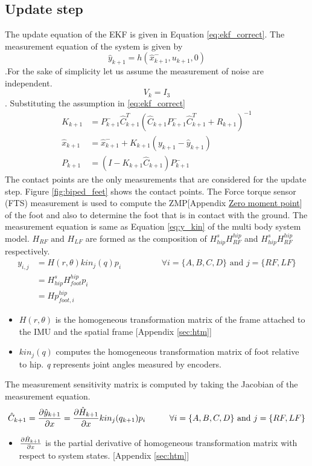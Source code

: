 \subsection{Update step}
The update equation of the EKF is given in Equation \ref{eq:ekf_correct}. The measurement equation of the system is given by $$\hat{y}_{k+1} = h(\hat{x}_{k+1}^-,u_{k+1},0)$$.For the sake of simplicity let us assume the measurement of noise are independent. $$V_k = I_3$$. Substituting the assumption in \ref{eq:ekf_correct}
\begin{equation}
\label{eq:imu_correct}
\begin{split}
K_{k+1} &= P_{k+1}^-\hat{C}_{k+1}^{T}(\hat{C}_{k+1}P_{k+1}^-\hat{C}_{k+1}^{T} + R_{k+1})^{-1}\\
\hat{x}_{k+1} &= \hat{x}_{k+1}^- + K_{k+1}(y_{k+1}-\hat{y}_{k+1})\\
P_{k+1} &= (I- K_{k+1}\hat{C}_{k+1})P_{k+1}^-
\end{split}
\end{equation}
The contact points are the only measurements that are considered for the update step. Figure \ref{fig:biped_feet} shows the contact points. The Force torque sensor (FTS) measurement is used to compute the ZMP[Appendix \underline{Zero moment point}] of the foot and also to determine the foot that is in contact with the ground. The measurement equation is same as Equation \ref{eq:y_kin} of the multi body system model. $H_{RF} \text{ and } H_{LF} $ are formed as the composition of $H_{hip}^s H_{RF}^{hip}$ and $H_{hip}^s H_{RF}^{hip}$ respectively.
\begin{equation}
    \label{eq:imu_msr}
    \begin{split}
    y_{i,j} &= H(r,\theta) kin_j(q)p_i \hspace{2cm} \forall i=\{A,B,C,D\} \text{ and } j=\{RF,LF\} \\
    &= H_{hip}^s H_{foot}^{hip}p_i \\
    &= H p_{foot,i}^{hip}
    \end{split}
\end{equation}
\begin{itemize}
    \item $H(r,\theta)$ is the homogeneous transformation matrix of the frame attached to the IMU and the spatial frame [Appendix \ref{sec:htm}]
    \item $kin_j(q)$ computes the homogeneous transformation matrix of foot relative to hip. \emph{q} represents joint angles measured by encoders.
\end{itemize}
The measurement sensitivity matrix is computed by taking the Jacobian of the measurement equation.
\begin{equation}
        \hat{C}_{k+1} = \frac{\partial {\hat{y}_{k+1}}}{\partial {x}} = \frac{\partial {\hat{H}_{k+1}}}{\partial {x}} kin_j(q_{k+1}) p_i \hspace{1cm} \forall i=\{A,B,C,D\} \text{ and } j=\{RF,LF\} 
\end{equation}
\begin{itemize}
    \item $\frac{\partial {\hat{H}_{k+1}}}{\partial {x}}$ is the partial derivative of homogeneous transformation matrix with respect to system states. [Appendix \ref{sec:htm}]
\end{itemize}


